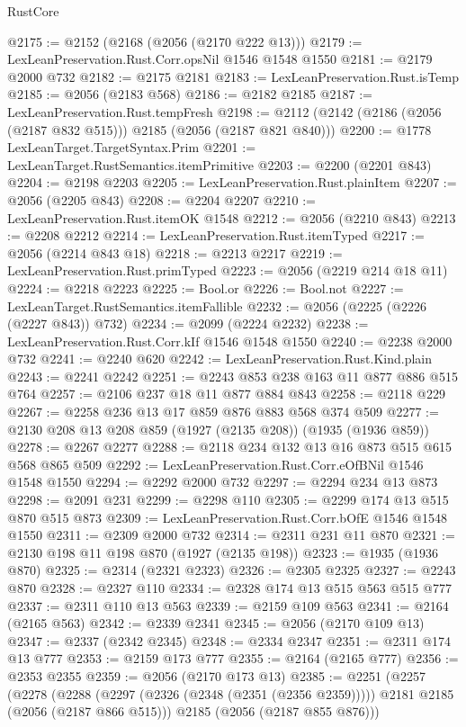 \begin{lexlean}{RustCore}
\begin{coremodule}
@2175 := @2152 (@2168 (@2056 (@2170 @222 @13)))
@2179 := LexLeanPreservation.Rust.Corr.opsNil @1546 @1548 @1550
@2181 := @2179 @2000 @732
@2182 := @2175 @2181
@2183 := LexLeanPreservation.Rust.isTemp
@2185 := @2056 (@2183 @568)
@2186 := @2182 @2185
@2187 := LexLeanPreservation.Rust.tempFresh
@2198 := @2112 (@2142 (@2186 (@2056 (@2187 @832 @515))) @2185 (@2056 (@2187 @821 @840)))
@2200 := @1778 LexLeanTarget.TargetSyntax.Prim
@2201 := LexLeanTarget.RustSemantics.itemPrimitive
@2203 := @2200 (@2201 @843)
@2204 := @2198 @2203
@2205 := LexLeanPreservation.Rust.plainItem
@2207 := @2056 (@2205 @843)
@2208 := @2204 @2207
@2210 := LexLeanPreservation.Rust.itemOK @1548
@2212 := @2056 (@2210 @843)
@2213 := @2208 @2212
@2214 := LexLeanPreservation.Rust.itemTyped
@2217 := @2056 (@2214 @843 @18)
@2218 := @2213 @2217
@2219 := LexLeanPreservation.Rust.primTyped
@2223 := @2056 (@2219 @214 @18 @11)
@2224 := @2218 @2223
@2225 := Bool.or
@2226 := Bool.not
@2227 := LexLeanTarget.RustSemantics.itemFallible
@2232 := @2056 (@2225 (@2226 (@2227 @843)) @732)
@2234 := @2099 (@2224 @2232)
@2238 := LexLeanPreservation.Rust.Corr.kIf @1546 @1548 @1550
@2240 := @2238 @2000 @732
@2241 := @2240 @620
@2242 := LexLeanPreservation.Rust.Kind.plain
@2243 := @2241 @2242
@2251 := @2243 @853 @238 @163 @11 @877 @886 @515 @764
@2257 := @2106 @237 @18 @11 @877 @884 @843
@2258 := @2118 @229
@2267 := @2258 @236 @13 @17 @859 @876 @883 @568 @374 @509
@2277 := @2130 @208 @13 @208 @859 (@1927 (@2135 @208)) (@1935 (@1936 @859))
@2278 := @2267 @2277
@2288 := @2118 @234 @132 @13 @16 @873 @515 @615 @568 @865 @509
@2292 := LexLeanPreservation.Rust.Corr.eOfBNil @1546 @1548 @1550
@2294 := @2292 @2000 @732
@2297 := @2294 @234 @13 @873
@2298 := @2091 @231
@2299 := @2298 @110
@2305 := @2299 @174 @13 @515 @870 @515 @873
@2309 := LexLeanPreservation.Rust.Corr.bOfE @1546 @1548 @1550
@2311 := @2309 @2000 @732
@2314 := @2311 @231 @11 @870
@2321 := @2130 @198 @11 @198 @870 (@1927 (@2135 @198))
@2323 := @1935 (@1936 @870)
@2325 := @2314 (@2321 @2323)
@2326 := @2305 @2325
@2327 := @2243 @870
@2328 := @2327 @110
@2334 := @2328 @174 @13 @515 @563 @515 @777
@2337 := @2311 @110 @13 @563
@2339 := @2159 @109 @563
@2341 := @2164 (@2165 @563)
@2342 := @2339 @2341
@2345 := @2056 (@2170 @109 @13)
@2347 := @2337 (@2342 @2345)
@2348 := @2334 @2347
@2351 := @2311 @174 @13 @777
@2353 := @2159 @173 @777
@2355 := @2164 (@2165 @777)
@2356 := @2353 @2355
@2359 := @2056 (@2170 @173 @13)
@2385 := @2251
    (@2257
      (@2278
        (@2288 (@2297 (@2326 (@2348 (@2351 (@2356 @2359))))) @2181 @2185 (@2056 (@2187 @866 @515)))
        @2185
        (@2056 (@2187 @855 @876)))

\end{coremodule}
\end{lexlean}
